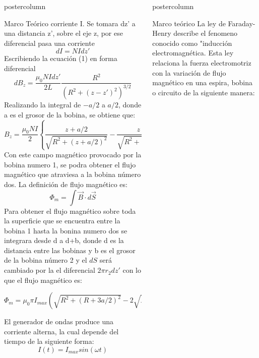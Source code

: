 \documentclass{beamer}
\newlength{\columnheight}
\begin{document}
\begin{columns}
\begin{column}{.50\textwidth}
\begin{beamercolorbox}[center]{postercolumn}
\begin{minipage}{.98\textwidth}
{\begin{myblock}{Marco Teórico}
corriente I. Se tomara dz' a una distancia z', sobre el eje z, por ese diferencial pasa una corriente 
\begin{equation*}
dI=N I dz'
\end{equation*}
Escribiendo la ecuación (1) en forma diferencial
\begin{equation}
dB_z = \frac{\mu_0 N I dz'}{2L} \frac{R^2}{(R^2+(z-z')^2)^{3/2}}
\end{equation}
Realizando la integral de $-a/2$ a $a/2$, donde a es el grosor de la bobina, se obtiene que:
\begin{equation}
B_z = \frac{\mu_0 N I}{2} \left \{ \frac{z+a/2}{\sqrt{R^2+(z+a/2)^2}} - \frac{z-a/2}{\sqrt{R^2+(z-a/2)^2}}\right \}
\end{equation}
Con este campo magnético provocado por la bobina numero 1, se podra obtener el flujo magnético que atraviesa a la bobina número dos. 
La definición de flujo magnético es:
\begin{equation}
\Phi_m = \int \vec{B} \cdot d\vec{S}
\end{equation}
Para obtener el flujo magnético sobre toda la superficie que se encuentra entre la bobina 1 hasta la bonina numero dos se integrara desde d a d+b, donde d es la distancia entre las bobinas y b es el grosor de la bobina número 2 y el $dS$ será cambiado por la el diferencial $2\pi r_2 dz'$ con lo que el flujo magnético es:\\
\changefontsizes{16pt}
\begin{center}
$\Phi_m = \mu_0 \pi  I_{max}( \sqrt{R^2+(R+3a/2)^2}-2\sqrt{R^2+(R+a/2)^2}+\sqrt{R^2+(R^2-a/2)^2})$
\end{center}
\normalize
El generador de ondas produce una corriente alterna, la cual depende del tiempo de la siguiente forma:
\begin{equation}
I(t)= I_{max} sin(\omega t)
\end{equation}
\end{myblock}
}\end{minipage}
\end{beamercolorbox}
\end{column}
\begin{column}{.50\textwidth}
\begin{beamercolorbox}[center]{postercolumn}
\begin{minipage}{.98\textwidth} 
\parbox[t][\columnheight]{\textwidth}{
\vspace*{1cm}
\begin{myblock}{Marco teórico}
La ley de Faraday-Henry describe el fenomeno conocido como "inducción electromagnética. Esta ley relaciona la fuerza electromotriz con la variación de flujo magnético en una espira, bobina o circuito de la siguiente manera:

\end{myblock}}
\end{minipage}
\end{beamercolorbox}
\end{column}
\end{columns}
\end{document}
